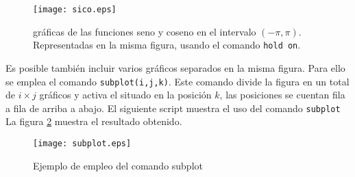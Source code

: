 










\begin{figure}[h]
\centering
\texttt{[image: sico.eps]}
\caption{gráficas de las funciones seno y coseno en el intervalo $(-\pi, \pi)$. Representadas en la misma figura, usando el comando \texttt{hold on}.}
\label{fig:sico}
\end{figure}

Es posible también incluir varios gráficos separados en la misma figura. 
Para ello se emplea el comando \texttt{subplot(i,j,k)}. Este comando divide la figura en un total de $i\times j$ gráficos y activa el situado en la posición $k$, las posiciones se cuentan fila a fila de arriba a abajo. El siguiente script muestra el uso del comando \texttt{subplot} La figura \ref{fig:subplot} muestra el resultado obtenido.
\begin{figure}[h]
\centering
\texttt{[image: subplot.eps]}
\caption{Ejemplo de empleo del comando subplot}
\label{fig:subplot}
\end{figure}




